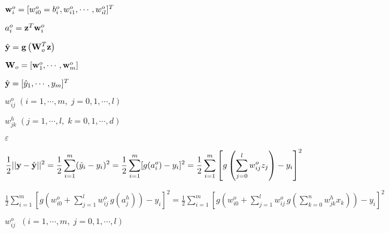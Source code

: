 \documentclass{article}
\def\lthtmlcheckvsize{\ifdim\ht\sizebox<\vsize 
  \ifdim\wd\sizebox<\hsize\expandafter\hfill\fi \expandafter\vfill
  \else\expandafter\vss\fi}%
\begin{document}
{\newpage\clearpage
{}%
$ {\bf w}_i^o=[w_{i0}^o=b_i^o,w_{i1}^o,\cdots,w_{il}^o]^T$%
\lthtmlindisplaymathZ
\lthtmlcheckvsize\clearpage}

{\newpage\clearpage
{}%
$ a^o_i={\bf z}^T{\bf w}^o_i$%
\lthtmlindisplaymathZ
\lthtmlcheckvsize\clearpage}

{\newpage\clearpage
{}%
$\displaystyle \hat{\bf y}={\bf g}\left( {\bf W}_o^T{\bf z} \right)$%
\lthtmlindisplaymathZ
\lthtmlcheckvsize\clearpage}

{\newpage\clearpage
{}%
$ {\bf W}_o=[{\bf w}^o_1,\cdots,{\bf w}^o_m]$%
\lthtmlindisplaymathZ
\lthtmlcheckvsize\clearpage}

{\newpage\clearpage
{}%
$ \hat{\bf y}=[\hat{y}_1,\cdots,y_m]^T$%
\lthtmlindisplaymathZ
\lthtmlcheckvsize\clearpage}

{\newpage\clearpage
{}%
$ w_{ij}^o\;(i=1,\cdots,m,\;j=0,1,\cdots,l)$%
\lthtmlindisplaymathZ
\lthtmlcheckvsize\clearpage}

{\newpage\clearpage
{}%
$ w_{jk}^h\;(j=1,\cdots,l,\;k=0,1,\cdots,d)$%
\lthtmlindisplaymathZ
\lthtmlcheckvsize\clearpage}

{\newpage\clearpage
{}%
$\displaystyle \varepsilon$%
\lthtmlindisplaymathZ
\lthtmlcheckvsize\clearpage}

{\newpage\clearpage
{}%
$\displaystyle \frac{1}{2}||{\bf y}-\hat{\bf y}||^2
=\frac{1}{2}\sum_{i=1}^m(\hat{y}_i-y_i)^2=\frac{1}{2}\sum_{i=1}^m[g(a^o_i)-y_i]^2
=\frac{1}{2}\sum_{i=1}^m\left[g\left(\sum_{j=0}^lw_{ij}^{o}z_j\right)-y_i\right]^2$%
\lthtmlindisplaymathZ
\lthtmlcheckvsize\clearpage}

{\newpage\clearpage
{}%
$\displaystyle \frac{1}{2}\sum_{i=1}^m\left[g\left(w_{i0}^o+\sum_{j=1}^l w_{ij}^o\,
g(a_j^h)\right)-y_i\right]^2
=\frac{1}{2}\sum_{i=1}^m\left[g\left(w_{i0}^o+\sum_{j=1}^l w_{ij}^o\,
g\left(\sum_{k=0}^n w_{jk}^hx_k\right)\right)-y_i\right]^2$%
\lthtmlindisplaymathZ
\lthtmlcheckvsize\clearpage}

{\newpage\clearpage
{}%
$ w_{ij}^{o}\;\;(i=1,\cdots,m,\;j=0,1,\cdots,l)$%
\lthtmlindisplaymathZ
\lthtmlcheckvsize\clearpage}
\end{document}
